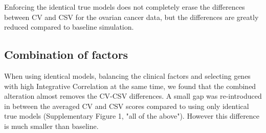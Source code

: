 \documentclass{bioinfo}
\newcommand{\fixme}[1]{\textsl{\textcolor{red}{FIXME: #1}}}
\begin{document}
  Enforcing the identical true models does not completely erase the differences between CV
  and CSV for the ovarian cancer data, but the differences are greatly reduced 
  compared to baseline simulation.
  
   


  \subsection{Combination of factors}

	
	When using identical models, balancing the clinical factors
	and selecting genes with high Integrative Correlation at the same time, 
	we found that the combined alteration almost removes the CV-CSV differences. 
	A small gap was re-introduced in between the averaged CV and CSV scores 
	compared to using only identical true models
	(Supplementary Figure 1, "all of the above"). However this difference 
	is much smaller than baseline. 
	
\end{document}
